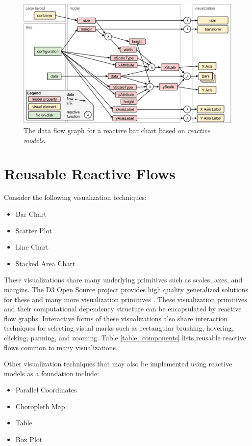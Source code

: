 \begin{figure}
  \centering
  \includegraphics[width=\figureWidth]{figs/barChartFlow.png}
  \caption [Reactive Bar Chart Flow]{The data flow graph for a reactive bar chart based on \emph{reactive models}.}
  \label{fig:barChartFlow}
\end{figure}

\section{Reusable Reactive Flows}
Consider the following visualization techniques:
\begin{itemize}
\item Bar Chart
\item Scatter Plot
\item Line Chart
\item Stacked Area Chart
\end{itemize}

These visualizations share many underlying primitives such as scales, axes, and margins. The D3 Open Source project provides high quality generalized solutions for these and many more visualization primitives \cite{d3}. These visualization primitives and their computational dependency structure can be encapsulated by reactive flow graphs. Interactive forms of these visualizations also share interaction techniques for selecting visual marks such as rectangular brushing, hovering, clicking, panning, and zooming. Table \ref{table_components} lists reusable reactive flows common to many visualizations.

Other visualization techniques that may also be implemented using reactive models as a foundation include:

\begin{itemize}
\item Parallel Coordinates
\item Choropleth Map
\item Table
\item Box Plot
\end{itemize}

